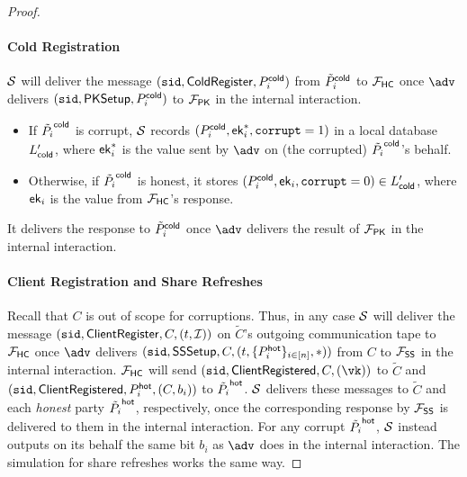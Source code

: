 \begin{proof}
\paragraph{Cold Registration} $\mathcal{S}$ will deliver the message $(\texttt{sid}, \mathsf{ColdRegister}, P_i^{\mathsf{cold}})$ from $\tilde{P}_i^{\mathsf{cold}}$ to $\mathcal{F}_\mathsf{HC}$ once $\adv$ delivers $(\texttt{sid}, \mathsf{PKSetup}, P_i^{\mathsf{cold}})$ to $\mathcal{F}_\mathsf{PK}$ in the internal interaction.
\begin{itemize}
    \item If $\tilde{P_i}^{\mathsf{cold}}$ is corrupt, $\mathcal{S}$ records $(P_i^{\mathsf{cold}}, \mathsf{ek}_i^*, \texttt{corrupt} = 1)$ in a local database $L_{\mathsf{cold}}'$, where $\mathsf{ek}_i^*$ is the value sent by $\adv$ on (the corrupted) $\tilde{P_i}^{\mathsf{cold}}$'s behalf.
    \item Otherwise, if $\tilde{P_i}^{\mathsf{cold}}$ is honest, it stores $(P_i^{\mathsf{cold}}, \mathsf{ek}_i, \texttt{corrupt} = 0) \in L_{\mathsf{cold}}'$, where $\mathsf{ek}_i$ is the value from $\mathcal{F}_\mathsf{HC}$'s response.
\end{itemize}
It delivers the response to $\tilde{P}_i^{\mathsf{cold}}$ once $\adv$ delivers the result of $\mathcal{F}_\mathsf{PK}$ in the internal interaction. 

\paragraph{Client Registration and Share Refreshes}
Recall that $C$ is out of scope for corruptions. Thus, in any case $\mathcal{S}$ will deliver the message $(\texttt{sid}, \mathsf{ClientRegister}, C,\allowbreak (t, \mathcal{I}))$ on $\tilde{C}$'s outgoing communication tape to $\mathcal{F}_\mathsf{HC}$ once $\adv$ delivers $(\texttt{sid},\allowbreak \mathsf{SSSetup},\allowbreak C, (t, \{P_i^{\mathsf{hot}}\}_{i \in [n]}, *))$ from $C$ to $\mathcal{F}_\mathsf{SS}$ in the internal interaction. $\mathcal{F}_\mathsf{HC}$ will send $(\texttt{sid}, \mathsf{ClientRegistered}, C, (\vk))$ to $\tilde{C}$ and $(\texttt{sid},\allowbreak \mathsf{ClientRegistered}, P_i^{\mathsf{hot}}, (C, b_i))$ to $\tilde{P_i}^{\mathsf{hot}}$. $\mathcal{S}$ delivers these messages to $\tilde{C}$ and each \emph{honest} party $\tilde{P_i}^{\mathsf{hot}}$, respectively, once the corresponding response by $\mathcal{F}_\mathsf{SS}$ is delivered to them in the internal interaction.
For any corrupt $\tilde{P_i}^{\mathsf{hot}}$, $\mathcal{S}$ instead outputs on its behalf the same bit $b_i$ as $\adv$ does in the internal interaction. The simulation for share refreshes works the same way.


\end{proof}
